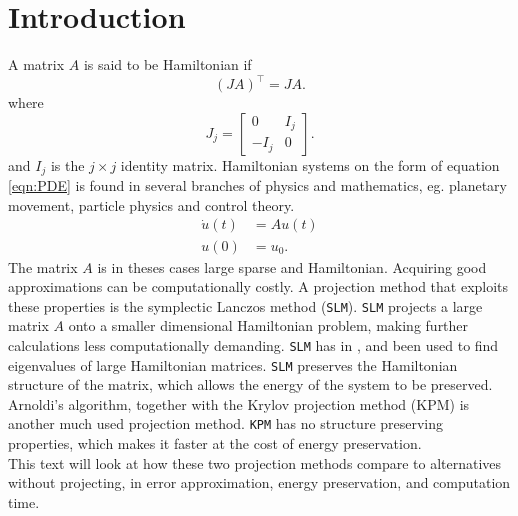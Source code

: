\chapter{Introduction} %
A matrix $A$ is said to be Hamiltonian if  \cite{Hamiltonian}
\begin{equation}
(JA)^{\top} = J A. 
\end{equation}
where
\begin{equation}
J_j = 
\begin{bmatrix}
0&I_j\\-I_j&0
\end{bmatrix}.
\end{equation}
and $I_j$ is the $j \times j$ identity matrix.
Hamiltonian systems on the form of equation \eqref{eqn:PDE} is found in several branches of physics and mathematics, eg. planetary movement, particle physics and control theory.
\begin{equation} 
\begin{aligned}
\dot{u}(t) &= A u(t)\\
u(0)&= u_0.
\end{aligned}
\label{eqn:PDE}
\end{equation}
The matrix $A$ is in theses cases large sparse and Hamiltonian. Acquiring good approximations can be computationally costly. A projection method that exploits these properties is the symplectic Lanczos method (\texttt{SLM}). \texttt{SLM} projects a large matrix $A$ onto a smaller dimensional Hamiltonian problem, making further calculations less computationally demanding. \texttt{SLM} has in \citep{SLM1}, \citep{SLM2} and \citep{SLM3} been used to find eigenvalues of large Hamiltonian matrices. \texttt{SLM} preserves the Hamiltonian structure of the matrix, which allows the energy of the system to be preserved.\\
Arnoldi's algorithm, together with the Krylov projection method (KPM) is another much used projection method. \texttt{KPM} has no structure preserving properties, which makes it faster at the cost of energy preservation. \\
This text will look at how these two projection methods compare to alternatives without projecting, in error approximation, energy preservation, and computation time. \\

